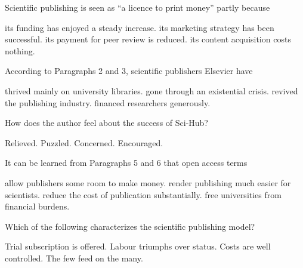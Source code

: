 \item Scientific publishing is seen as ``a licence to print money'' partly because
\begin{tasks}
	\task its funding has enjoyed a steady increase.
	\task its marketing strategy has been successful.
	\task its payment for peer review is reduced.
	\task its content acquisition costs nothing.
\end{tasks}
\item According to Paragraphs 2 and 3, scientific publishers Elsevier have
\begin{tasks}
	\task thrived mainly on university libraries.
	\task gone through an existential crisis.
	\task revived the publishing industry.
	\task financed researchers generously.
\end{tasks}
\item How does the author feel about the success of Sci-Hub?
\begin{tasks}
	\task Relieved.
	\task Puzzled.
	\task Concerned.
	\task Encouraged.
\end{tasks}
\item It can be learned from Paragraphs 5 and 6 that open access terms
\begin{tasks}
	\task allow publishers some room to make money.
	\task render publishing much easier for scientists.
	\task reduce the cost of publication substantially.
	\task free universities from financial burdens.
\end{tasks}
\item Which of the following characterizes the scientific publishing model?
\begin{tasks}
	\task Trial subscription is offered.
	\task Labour triumphs over status.
	\task Costs are well controlled.
	\task The few feed on the many.
\end{tasks}